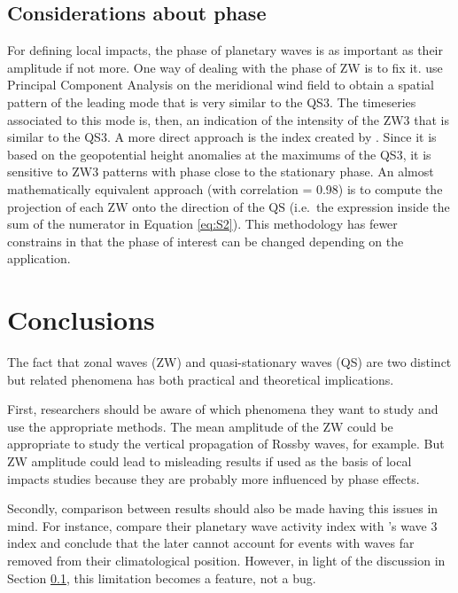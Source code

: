 \documentclass[draft,linenumbers]{agujournal2018}
\begin{document}
\subsection{Considerations about phase}

\label{sec:phase}

For defining local impacts, the phase of planetary waves is as important
as their amplitude if not more. One way of dealing with the phase of ZW
is to fix it. \citet{Yuan2008} use Principal Component Analysis on the
meridional wind field to obtain a spatial pattern of the leading mode
that is very similar to the QS3. The timeseries associated to this mode
is, then, an indication of the intensity of the ZW3 that is similar to
the QS3. A more direct approach is the index created by
\citet{Raphael2004}. Since it is based on the geopotential height
anomalies at the maximums of the QS3, it is sensitive to ZW3 patterns
with phase close to the stationary phase. An almost mathematically
equivalent approach (with correlation = 0.98) is to compute the
projection of each \(\mathrm{ZW}\) onto the direction of the
\(\mathrm{QS}\) (i.e.~the expression inside the sum of the numerator in
Equation \ref{eq:S2}). This methodology has fewer constrains in that the
phase of interest can be changed depending on the application.

\section{Conclusions}

The fact that zonal waves (ZW) and quasi-stationary waves (QS) are two
distinct but related phenomena has both practical and theoretical
implications.

First, researchers should be aware of which phenomena they want to study
and use the appropriate methods. The mean amplitude of the ZW could be
appropriate to study the vertical propagation of Rossby waves, for
example. But ZW amplitude could lead to misleading results if used as
the basis of local impacts studies because they are probably more
influenced by phase effects.

Secondly, comparison between results should also be made having this
issues in mind. For instance, \citet{Irving2015} compare their planetary
wave activity index with \citet{Raphael2004}'s wave 3 index and conclude
that the later cannot account for events with waves far removed from
their climatological position. However, in light of the discussion in
Section \ref{sec:phase}, this limitation becomes a feature, not a bug.
\end{document}
